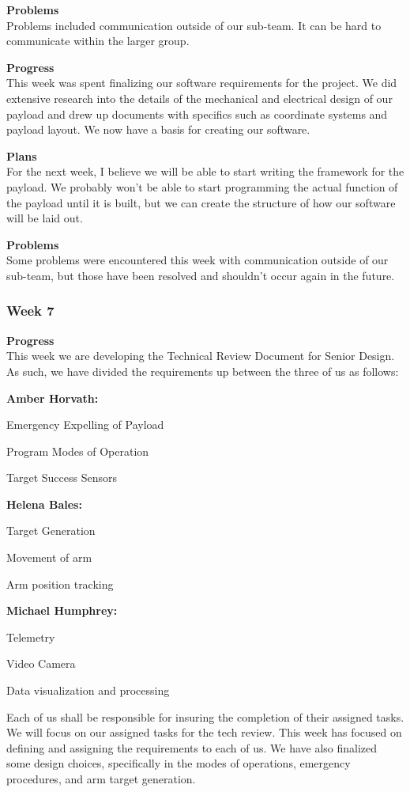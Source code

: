 \textbf{Problems} \\
Problems included communication outside of our sub-team. It can be hard to communicate within the larger group.

\textbf{Progress} \\
This week was spent finalizing our software requirements for the project. We did extensive research into the details of the mechanical and electrical design of our \gls{payload} and drew up documents with specifics such as coordinate systems and \gls{payload} layout. We now have a basis for creating our software.

\textbf{Plans} \\
For the next week, I believe we will be able to start writing the framework for the \gls{payload}. We probably won't be able to start programming the actual function of the \gls{payload} until it is built, but we can create the structure of how our software will be laid out.

\textbf{Problems} \\
Some problems were encountered this week with communication outside of our sub-team, but those have been resolved and shouldn't occur again in the future.

\subsubsection{Week 7}
\textbf{Progress} \\
This week we are developing the Technical Review Document for Senior Design. As such, we have divided the requirements up between the three of us as follows:

\textbf{Amber Horvath:}

    Emergency Expelling of Payload

    Program Modes of Operation

    Target Success Sensors

\textbf{Helena Bales:}

    Target Generation

    Movement of arm

    Arm position tracking

\textbf{Michael Humphrey:}

    Telemetry

    Video Camera

    Data visualization and processing

Each of us shall be responsible for insuring the completion of their assigned tasks. We will focus on our assigned tasks for the tech review. This week has focused on defining and assigning the requirements to each of us. We have also finalized some design choices, specifically in the modes of operations, emergency procedures, and arm target generation.

